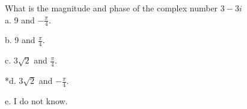 
What is the magnitude and phase of the complex number \(3-3i\)\\

a. 9 and \(-\frac{\pi}{4}\).

b. 9 and \(\frac{\pi}{4}\).

c. 3\(\sqrt{2}\) and \(\frac{\pi}{4}\).

*d. 3\(\sqrt{2}\) and \(-\frac{\pi}{4}\).

e. I do not know.\\
